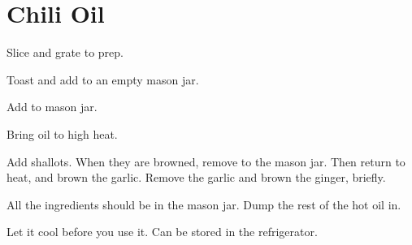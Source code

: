 \section{Chili Oil}
\begin{recipe}



Slice and grate to prep. 


Toast and add to an empty mason jar.


Add to mason jar. 


Bring oil to high heat. 

Add shallots. When they are browned, remove to the mason jar. 
Then return to heat, and brown the garlic. 
Remove the garlic and brown the ginger, briefly. 

All the ingredients should be in the mason jar. 
Dump the rest of the hot oil in. 

Let it cool before you use it. Can be stored in the refrigerator. 

\end{recipe}
